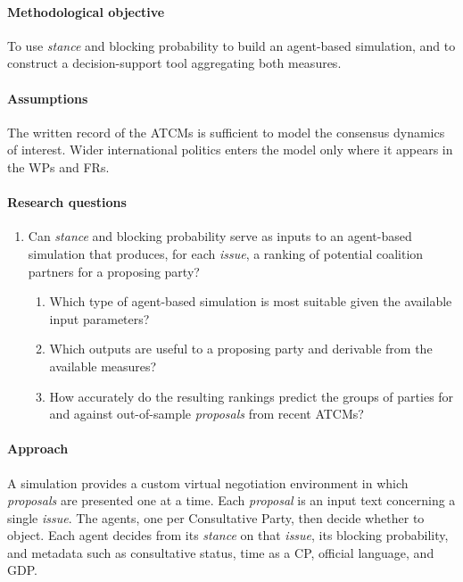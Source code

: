 \paragraph{Methodological objective}
To use \textit{stance} and blocking probability to build an agent-based simulation, and to
construct a decision-support tool aggregating both measures.

\paragraph{Assumptions}
The written record of the ATCMs is sufficient to model the consensus dynamics of interest.
Wider international politics enters the model only where it appears in the WPs and FRs.

\paragraph{Research questions}
\begin{enumerate}[label=\alph*.]
  \item Can \textit{stance} and blocking probability serve as inputs to an agent-based simulation
  that produces, for each \textit{issue}, a ranking of potential coalition partners for a
  proposing party?
  \begin{enumerate}[label=\roman*.]
    \item Which type of agent-based simulation is most suitable given the available input
    parameters?
    \item Which outputs are useful to a proposing party and derivable from the available
    measures?
    \item How accurately do the resulting rankings predict the groups of parties for and against
    out-of-sample \textit{proposals} from recent ATCMs?
  \end{enumerate}
\end{enumerate}

\paragraph{Approach}
A simulation provides a custom virtual negotiation environment in which \textit{proposals} are
presented one at a time. Each \textit{proposal} is an input text concerning a single
\textit{issue}. The agents, one per Consultative Party, then decide whether to object. Each agent
decides from its \textit{stance} on that \textit{issue}, its blocking probability, and metadata
such as consultative status, time as a CP, official language, and GDP.

